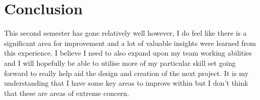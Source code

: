 \documentclass{scrartcl}
\begin{document}
\section{Conclusion}

This second semester has gone relatively well however, I do feel like there is a significant area for improvement and a lot of valuable insights were learned from this experience. I believe I need to also expand upon my team working abilities and I will hopefully be able to utilise more of my particular skill set going forward to really help aid the design and creation of the next project. It is my understanding that I have some key areas to improve within but I don't think that these are areas of extreme concern.
\end{document}
